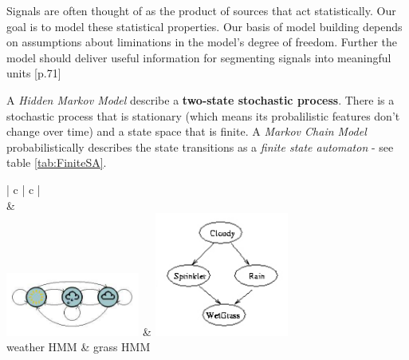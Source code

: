 

Signals are often thought of as the product of sources that act statistically.
Our goal is to model these statistical properties. Our basis of model building depends on 
assumptions about liminations in the model's degree of freedom. 
Further the model should deliver useful information for segmenting signals into meaningful units
\cite{MMPR}[p.71]

A \emph{Hidden Markov Model} describe a \textbf{two-state stochastic process}.
There is a stochastic process that is stationary (which means its probalilistic features don't change over time) and a state space that is finite.
A \emph{Markov Chain Model} probabilistically describes the state transitions as a \emph{finite state automaton} - see table \ref{tab:FiniteSA}.

\begin{table}[h]
	\begin{center}
		\begin{tabular}{| c | c |}
			\hline
			 \\
			\hline
			& \\
			\includegraphics[width=0.33\textwidth]{./Images/FiniteStateAutomaton_1.png} & \includegraphics[width=0.33\textwidth]{./Images/FiniteStateAutomaton_2.png} \\
			\hline
			weather HMM \cite{hmm_fb} & grass HMM \cite{gm_bn} \\
			\hline
		\end{tabular}
	\end{center}
	\caption{Two finite state automatons that describe the state space of two different HMMs. Nodes correspond to states and edges to transition probabilites betwenn states that are bigger than $0$.}
	\label{tab:FiniteSA}
\end{table}

